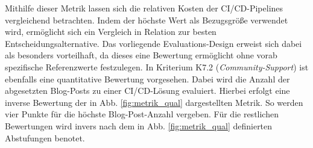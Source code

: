 \vspace*{-15mm}
Mithilfe dieser Metrik lassen sich die relativen Kosten der CI/CD-Pipelines vergleichend betrachten. Indem der höchste Wert als Bezugsgröße verwendet wird, ermöglicht sich ein Vergleich in Relation zur besten Entscheidungsalternative. Das vorliegende Evaluations-Design erweist sich dabei als besonders vorteilhaft, da dieses eine Bewertung ermöglicht ohne vorab spezifische Referenzwerte festzulegen. In Kriterium K7.2 (\textit{Community-Support}) ist ebenfalls eine quantitative Bewertung vorgesehen. Dabei wird die Anzahl der abgesetzten Blog-Posts zu einer CI/CD-Lösung evaluiert. Hierbei erfolgt eine inverse Bewertung der in Abb. \ref*{fig:metrik_qual} dargestellten Metrik. So werden vier Punkte für die höchste Blog-Post-Anzahl vergeben. Für die restlichen Bewertungen wird invers nach dem in Abb. \ref*{fig:metrik_qual} definierten Abstufungen benotet. 

